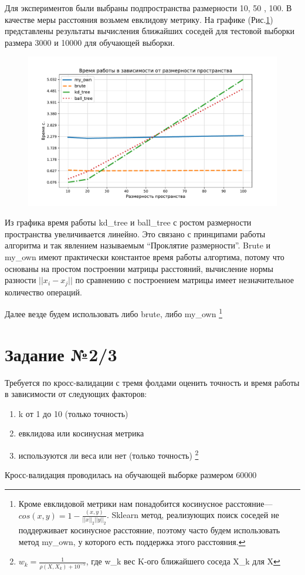 \documentclass[12pt,fleqn]{article}
\begin{document}
Для экспериментов были выбраны подпространства размерности 10, 50 , 100.
В качестве меры расстояния возьмем евклидову метрику.
\newpage
На графике (Рис.\ref{pic1}) представлены результаты вычисления ближайших соседей для тестовой выборки размера 3000 и 10000
для обучающей выборки. 
\begin{figure}
    \centering
    \includegraphics[width=15cm]{task1.pdf} 
    \caption{}
    \label{pic1}
\end{figure}

Из графика время работы kd\_tree и ball\_tree с ростом размерности пространства увеличивается линейно.
Это связано с принципами работы алгоритма и так явлением называемым ``Проклятие размерности''.
Brute и my\_own имеют практически константое время работы алгортима, потому что основаны на простом построении матрицы 
расстояний,  вычисление нормы разности $||x_i-x_j||$  по сравнению с построением матрицы имеет
незначительное количество операций. 

Далее везде будем использовать либо brute, либо my\_own 
\footnote{Кроме евклидовой метрики нам понадобится косинусное расстояние---
$cos(x, y)=1- \frac{(x, y)}{||x||_2||y||_2}$.
Sklearn метод, реализующих поиск соседей не поддерживает косинусное расстояние,
поэтому часто будем использовать метод my\_own, у которого есть поддержка этого расстояния.}

\section{Задание №2/3}
Требуется по кросс-валидации с тремя фолдами оценить точность и время работы в зависимости от следующих
факторов:
\begin{enumerate}
    \item k от 1 до 10 (только точность)
    \item евклидова или косинусная метрика
    \item используются ли веса или нет (только точность)
    \footnote{$w_k=\frac{1}{\rho(X,X_k)+10^{-5}}$, где w\_k вес K-ого ближайшего соседа X\_k для X}
\end{enumerate}
Кросс-валидация проводилась на обучающей выборке размером 60000
\newpage
\end{document}
